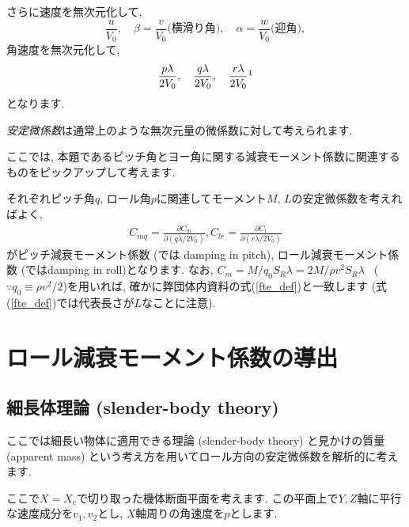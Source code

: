\documentclass[uplatex,dvipdfmx,a4j,11  pt]{jsarticle}
\begin{document}
さらに速度を無次元化して,
\begin{equation}
  \frac{u}{V_0}, \quad \beta=\frac{v}{V_0} \text{(横滑り角)}, \quad \alpha = \frac{w}{V_0} \text{(迎角)},\label{velocity_nondimentional}
\end{equation}
角速度を無次元化して,
\begin{equation}
  \frac{p\lambda}{2V_0}, \quad
  \frac{q\lambda}{2V_0}, \quad
  \frac{r\lambda}{2V_0}\footnotemark
\end{equation}
となります.

\emph{安定微係数}は通常上のような無次元量の微係数に対して考えられます.

ここでは, 本題であるピッチ角とヨー角に関する減衰モーメント係数に関連するものをピックアップして考えます.

それぞれピッチ角$q$, ロール角$p$に関連してモーメント$M$, $L$の安定微係数を考えればよく,
\begin{gather}
  C_{mq} = \frac{\partial C_m}{\partial (q\lambda/2V_0)},
  C_{lr} = \frac{\partial C_l}{\partial (r\lambda/2V_0)}\label{damping_moment_coef}
\end{gather}
がピッチ減衰モーメント係数 (\cite{aerodynamics}では damping in pitch), ロール減衰モーメント係数 (\cite{aerodynamics}ではdamping in roll)となります.
なお, $C_m = M/q_0S_R\lambda = 2M/\rho v^2 S_R \lambda$ \, ($\because q_0 \equiv \rho v^2 /2$)を用いれば, 確かに弊団体内資料の式(\ref{fte_def})と一致します
(式(\ref{fte_def})では代表長さが$L$なことに注意).

\section{ロール減衰モーメント係数の導出}

\subsection{細長体理論 (slender-body theory)}
ここでは細長い物体に適用できる理論 (slender-body theory) と見かけの質量 (apparent mass) という考え方を用いてロール方向の安定微係数を解析的に考えます.

ここで$X = X_c$で切り取った機体断面平面を考えます.
この平面上で$Y, Z$軸に平行な速度成分を$v_1, v_2$とし, $X$軸周りの角速度を$p$とします.
\end{document}

